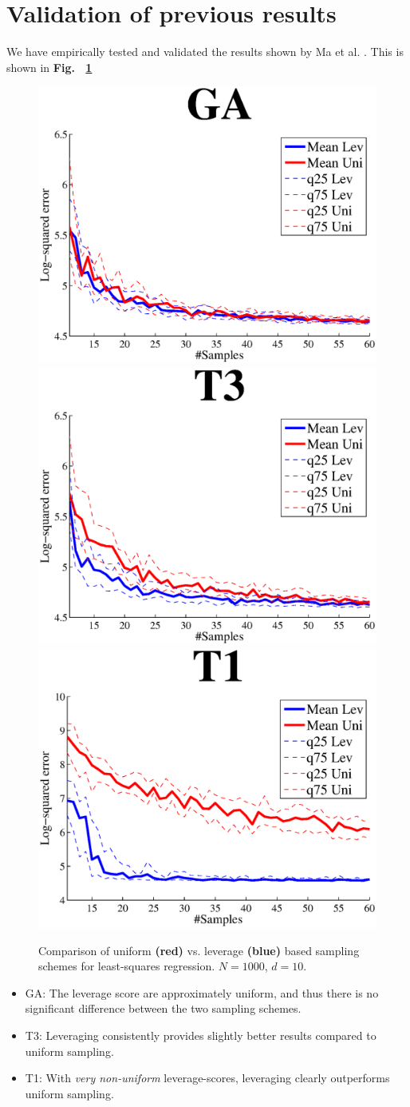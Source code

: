 \documentclass{article}
\begin{document}
\section{Validation of previous results}
We have empirically tested and validated the results shown by Ma et al. \cite{Ma}. This is shown in {\bf Fig.~ \ref{fig:regression_results}}
\begin{figure}[!b]
\centering
\includegraphics[width=.49\linewidth]{images/GALS.eps}
\includegraphics[width=.49\linewidth]{images/T3LS.eps}
\includegraphics[width=.49\linewidth]{images/T1LS.eps}
\caption{Comparison of uniform {\bf\color{red}(red)} vs. leverage {\bf\color{blue}(blue)} based sampling schemes for least-squares regression. $N = 1000$, $d = 10$.}
\label{fig:regression_results}
\end{figure}

\begin{itemize}
\item GA: The leverage score are approximately uniform, and thus there is no significant difference between the two sampling schemes.
\item T3: Leveraging consistently provides slightly better results compared to uniform sampling.
\item T1: With \emph{very non-uniform} leverage-scores, leveraging clearly outperforms uniform sampling.
\end{itemize}
\end{document}
